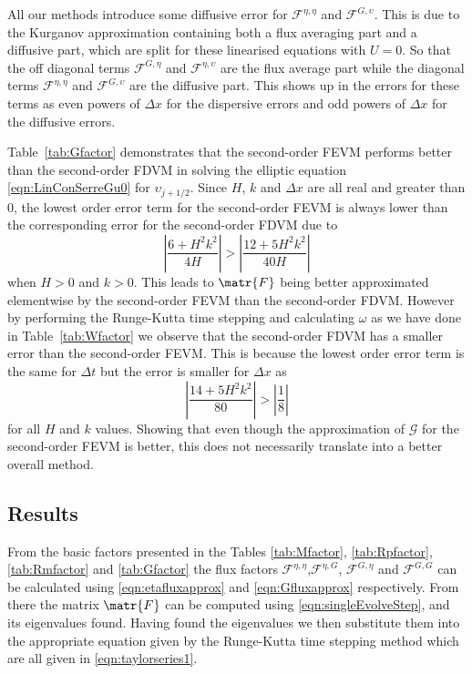 All our methods introduce some diffusive error for $ \mathcal{F}^{\eta,\eta}$ and $\mathcal{F}^{G,\upsilon}$. This is due to the Kurganov approximation containing both a flux averaging part and a diffusive part, which are split for these linearised equations with $U=0$. So that the off diagonal terms $\mathcal{F}^{G,\eta}$ and $\mathcal{F}^{\eta,\upsilon}$ are the flux average part while the diagonal terms $\mathcal{F}^{\eta,\eta}$ and $\mathcal{F}^{G,\upsilon}$ are the diffusive part. This shows up in the errors for these terms as even powers of $\Delta x$ for the dispersive errors and odd powers of $\Delta x$ for the diffusive errors.

Table~\ref{tab:Gfactor} demonstrates that the second-order FEVM performs better than the second-order FDVM in solving the elliptic equation \eqref{eqn:LinConSerreGu0} for $\upsilon_{j+1/2}$. Since $H$, $k$ and $\Delta x$ are all real and greater than $0$, the lowest order error term for the second-order FEVM is always lower than the corresponding error for the second-order FDVM due to %
%
\[\left|\frac{6 + H^2 k^2}{4H} \right| > \left|\frac{12 + 5H^2 k^2}{40H} \right|\] 
%
when $H  > 0$ and $k > 0$. This leads to $\matr{F}$ being better approximated elementwise by the second-order FEVM than the second-order FDVM. However by performing the Runge-Kutta time stepping and calculating $\omega$ as we have done in Table~\ref{tab:Wfactor} we observe that the second-order FDVM has a smaller error than the second-order FEVM. This is because the lowest order error term is the same for $\Delta t$ but the error is smaller for $\Delta x$ as
\[\left|\frac{14 + 5H^2 k^2}{80} \right| > \left|\frac{1}{8} \right|\] 
for all $H$ and $k$ values. Showing that even though the approximation of $\mathcal{G}$ for the second-order FEVM is better, this does not necessarily translate into a better overall method.


\subsection{Results}
From the basic factors presented in the Tables \ref{tab:Mfactor}, \ref{tab:Rpfactor}, \ref{tab:Rmfactor} and \ref{tab:Gfactor} the flux factors $\mathcal{F}^{\eta,\eta}$,$\mathcal{F}^{\eta,G}$, $\mathcal{F}^{G,\eta}$ and $\mathcal{F}^{G,G}$
can be calculated using \eqref{eqn:etafluxapprox} and \eqref{eqn:Gfluxapprox} respectively. From there the matrix $\matr{F}$ can be computed using \eqref{eqn:singleEvolveStep}, and its eigenvalues found. Having found the eigenvalues we then substitute them into the appropriate equation given by the Runge-Kutta time stepping method which are all given in \eqref{eqn:taylorseries1}. 

